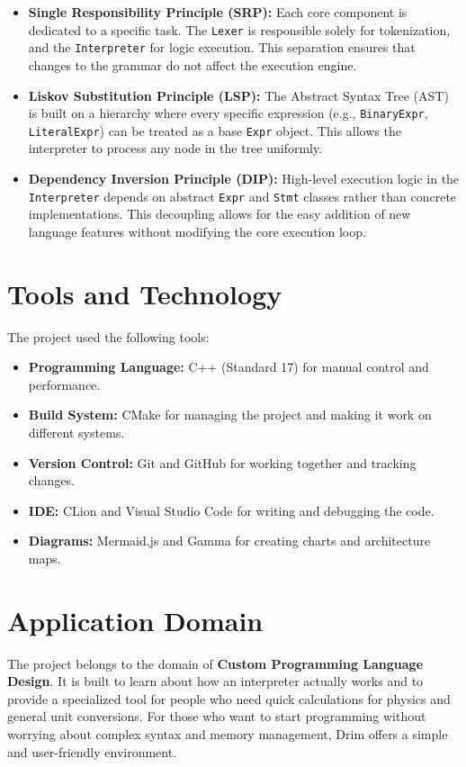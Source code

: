 \documentclass[12pt, a4paper]{article}
\begin{document}
\begin{itemize}
    \item \textbf{Single Responsibility Principle (SRP):} Each core component is dedicated to a specific task. The \texttt{Lexer} is responsible solely for tokenization, and the \texttt{Interpreter} for logic execution. This separation ensures that changes to the grammar do not affect the execution engine.
    \item \textbf{Liskov Substitution Principle (LSP):} The Abstract Syntax Tree (AST) is built on a hierarchy where every specific expression (e.g., \texttt{BinaryExpr}, \texttt{LiteralExpr}) can be treated as a base \texttt{Expr} object. This allows the interpreter to process any node in the tree uniformly.
    \item \textbf{Dependency Inversion Principle (DIP):} High-level execution logic in the \texttt{Interpreter} depends on abstract \texttt{Expr} and \texttt{Stmt} classes rather than concrete implementations. This decoupling allows for the easy addition of new language features without modifying the core execution loop.
\end{itemize}

\vspace{1cm}

\section{Tools and Technology}
The project used the following tools:
\begin{itemize}
    \item \textbf{Programming Language:} C++ (Standard 17) for manual control and performance.
    \item \textbf{Build System:} CMake for managing the project and making it work on different systems.
    \item \textbf{Version Control:} Git and GitHub for working together and tracking changes.
    \item \textbf{IDE:} CLion and Visual Studio Code for writing and debugging the code.
    \item \textbf{Diagrams:} Mermaid.js and Gamma for creating charts and architecture maps.
\end{itemize}

\newpage

\section{Application Domain}
The project belongs to the domain of \textbf{Custom Programming Language Design}. It is built to learn about how an interpreter actually works and to provide a specialized tool for people who need quick calculations for physics and general unit conversions. For those who want to start programming without worrying about complex syntax and memory management, Drim offers a simple and user-friendly environment.
\end{document}

